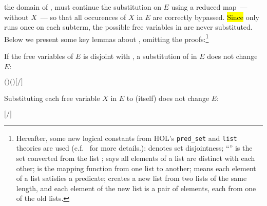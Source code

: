 the domain of ,  must continue the
substitution on $E$ using a reduced map~--- without $X$~--- so that all
occurences of $X$ in $E$ are correctly bypassed.
\hl{Since}  only runs
once on each subterm, the possible free variables in   are never
 substituted. 
Below we present some key lemmas about
, omitting the proofs:\footnote{Hereafter,
  some new logical constants from HOL's \texttt{pred_set}
and \texttt{list} theories are used (c.f.~\cite{holdesc} for more
details.):  denotes set disjointness;
``'' is the set converted from the list ;
 says
all elements of a list are distinct with each other;  is
the mapping function from one list to another;  means
each element of a list satisfies a predicate;  creates a
new list from two lists of the same length, and each element of the new list is a pair of
elements, each from one of the old lists.}

\begin{lemma}
If the free variables of $E$ is disjoint with , a
substitution of  in $E$ does not change $E$:
\begin{alltt}
\HOLTokenTurnstile{}  \ensuremath{(} \ensuremath{)} \ensuremath{(} \ensuremath{)} \HOLSymConst{\HOLTokenConj{}}   \HOLSymConst{\ensuremath{=}}   \HOLSymConst{\HOLTokenImp{}} \ensuremath{[}\ensuremath{/}\ensuremath{]}  \HOLSymConst{\ensuremath{=}} 
\end{alltt}
\end{lemma}

\begin{lemma}
  Substituting each free variable $X$ %
  in $E$ to  (itself) does not change $E$:
\begin{alltt}
\HOLTokenTurnstile{}   \HOLSymConst{\HOLTokenImp{}} \ensuremath{[}  \ensuremath{/}\ensuremath{]}  \HOLSymConst{\ensuremath{=}} 
\end{alltt}
\end{lemma}

